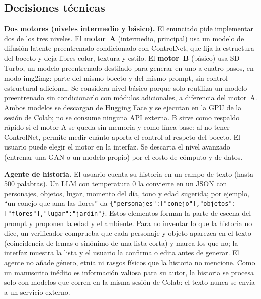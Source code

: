 \documentclass[10pt,a4paper,twocolumn]{article}
\begin{document}
\subsection{Decisiones técnicas}
\textbf{Dos motores (niveles intermedio y básico).} El enunciado pide implementar dos de los tres niveles. El \textbf{motor~A} (intermedio, principal) usa un modelo de difusión latente preentrenado condicionado con ControlNet, que fija la estructura del boceto y deja libres color, textura y estilo. El \textbf{motor~B} (básico) usa SD-Turbo, un modelo preentrenado destilado para generar en uno a cuatro pasos, en modo img2img: parte del mismo boceto y del mismo prompt, sin control estructural adicional. Se considera nivel básico porque solo reutiliza un modelo preentrenado sin condicionarlo con módulos adicionales, a diferencia del motor~A. Ambos modelos se descargan de Hugging Face y se ejecutan en la GPU de la sesión de Colab; no se consume ninguna API externa. B sirve como respaldo rápido si el motor A se queda sin memoria y como línea base: al no tener ControlNet, permite medir cuánto aporta el control al respeto del boceto. El usuario puede elegir el motor en la interfaz. Se descarta el nivel avanzado (entrenar una GAN o un modelo propio) por el costo de cómputo y de datos.

\textbf{Agente de historia.} El usuario cuenta su historia en un campo de texto (hasta 500 palabras). Un LLM con temperatura 0 la convierte en un JSON con personajes, objetos, lugar, momento del día, tono y edad sugerida; por ejemplo, ``un conejo que ama las flores'' da \lstinline[basicstyle=\ttfamily\footnotesize]|{"personajes":["conejo"],"objetos":["flores"],"lugar":"jardin"}|. Estos elementos forman la parte de escena del prompt y proponen la edad y el ambiente. Para no inventar lo que la historia no dice, un verificador comprueba que cada personaje y objeto aparezca en el texto (coincidencia de lemas o sinónimo de una lista corta) y marca los que no; la interfaz muestra la lista y el usuario la confirma o edita antes de generar. El agente no añade género, etnia ni rasgos físicos que la historia no mencione. Como un manuscrito inédito es información valiosa para su autor, la historia se procesa solo con modelos que corren en la misma sesión de Colab: el texto nunca se envía a un servicio externo.
\end{document}

